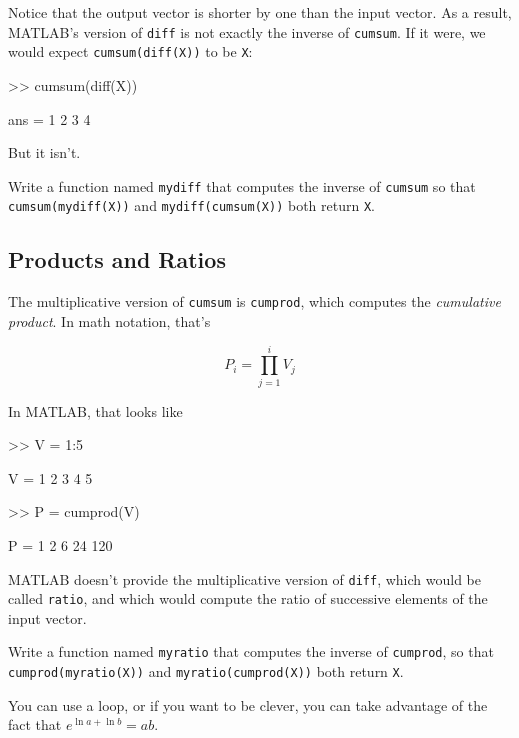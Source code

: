 \documentclass[../../book.tex]{subfiles}
\begin{document}
Notice that the output vector is shorter by one than the input
vector.  As a result, MATLAB's version of \lstinline{diff} is not
exactly the inverse of \lstinline{cumsum}.  If it were, we would
expect \lstinline{cumsum(diff(X))} to be \lstinline{X}:

\begin{code}
>> cumsum(diff(X))

ans = 1     2     3     4
\end{code}

But it isn't.

\begin{ex}
Write a function named \lstinline{mydiff} that computes the
inverse of \lstinline{cumsum} so that \lstinline{cumsum(mydiff(X))} and
\lstinline{mydiff(cumsum(X))} both return \lstinline{X}.

\end{ex}


\subsection{Products and Ratios}

The multiplicative version of \lstinline{cumsum} is \lstinline{cumprod},
which computes the \emph{cumulative product}.  In math notation,
that's


\begin{equation*}
P_i = \prod_{j=1}^i V_j
\end{equation*}

In MATLAB, that looks like

\begin{code}
>> V = 1:5

V = 1     2     3     4     5

>> P = cumprod(V)

P = 1     2     6    24   120
\end{code}

MATLAB doesn't provide the multiplicative version
of \lstinline{diff}, which would be called \lstinline{ratio}, and which would
compute the ratio of successive elements of the input vector.

\begin{ex}
Write a function named \lstinline{myratio} that computes the
inverse of \lstinline{cumprod}, so that \lstinline{cumprod(myratio(X))} and
\lstinline{myratio(cumprod(X))} both
return \lstinline{X}.

You can use a loop, or if you want to be clever, you can take
advantage of the fact that $e^{\ln a + \ln b} = a b$.


\end{ex}
\end{document}
